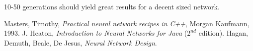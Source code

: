 \documentclass[]{scrartcl}
\begin{document}
10-50 generations should yield great results for a decent sized network.

\begin{thebibliography}{9}
 Masters, Timothy, \emph{Practical neural network recipes in C++}, Morgan Kaufmann, 1993.
 J. Heaton, \emph{Introduction to Neural Networks for Java} ($2^{nd}$ edition).
 Hagan, Demuth, Beale, De Jesus, \emph{Neural Network Design}.
\end{thebibliography}
\end{document}
